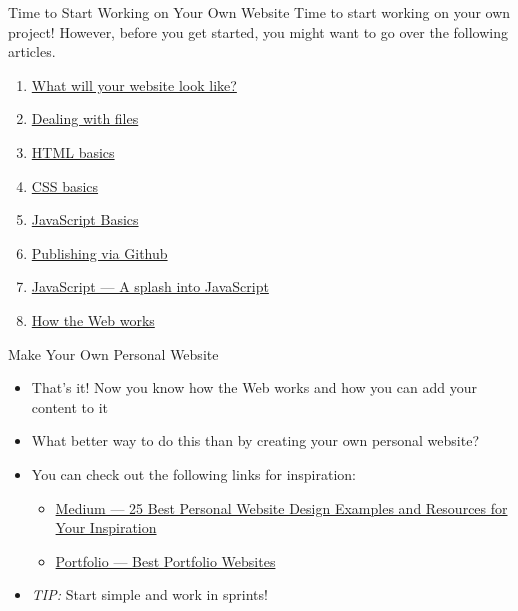 \documentclass[aspectratio=169]{beamer}
\begin{document}
\begin{darkframes}
    \begin{frame}{Time to Start Working on Your Own Website}
        Time to start working on your own project! However, before you get started, you might want to go over the following articles.
        \begin{enumerate}
            \item \href{https://developer.mozilla.org/en-US/docs/Learn/Getting_started_with_the_web/What_will_your_website_look_like}{What will your website look like?}
            \item \href{https://developer.mozilla.org/en-US/docs/Learn/Getting_started_with_the_web/Dealing_with_files}{Dealing with files}
            \item \href{https://developer.mozilla.org/en-US/docs/Learn/Getting_started_with_the_web/HTML_basics}{HTML basics}
            \item \href{https://developer.mozilla.org/en-US/docs/Learn/Getting_started_with_the_web/CSS_basics}{CSS basics}
            \item \href{https://developer.mozilla.org/en-US/docs/Learn/Getting_started_with_the_web/JavaScript_basics}{JavaScript Basics}
            \item \href{https://developer.mozilla.org/en-US/docs/Learn/Getting_started_with_the_web/Publishing_your_website\#Publishing_via_GitHub}{Publishing via Github}
            \item \href{https://developer.mozilla.org/en-US/docs/Learn/JavaScript/First_steps/A_first_splash}{JavaScript — A splash into JavaScript}
            \item \href{https://developer.mozilla.org/en-US/docs/Learn/Getting_started_with_the_web/How_the_Web_works}{How the Web works}
        \end{enumerate}
    \end{frame}
    
    \begin{frame}{Make Your Own Personal Website}
        \begin{itemize}
            \item That's it! Now you know how the Web works and how you can add your content to it
            \item What better way to do this than by creating your own personal website?
            \item You can check out the following links for inspiration:
            \begin{itemize}
                \item \href{https://medium.muz.li/25-best-personal-website-design-examples-and-resources-for-your-inspiration-446f7ac0bb71}{Medium — 25 Best Personal Website Design Examples and Resources for Your Inspiration}
                \item \href{https://www.awwwards.com/websites/portfolio/}{Portfolio — Best Portfolio Websites}
            \end{itemize}
            \item \textit{TIP:} Start simple and work in sprints!
        \end{itemize}
    \end{frame}
    
    \end{darkframes}
\end{document}
